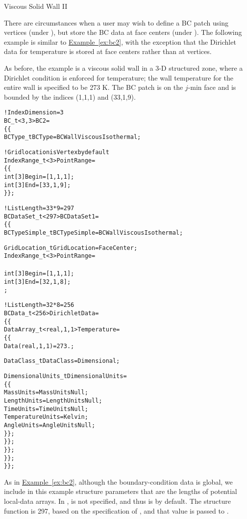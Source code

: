 \newpage
\begin{example}{Viscous Solid Wall II}
\label{ex:bc6}

There are circumstances when a user may wish to define a BC patch using
vertices (under ), but store the BC data at face centers
(under ).
The following example is similar to \hyperref[ex:bc2]{Example~\ref*{ex:bc2}},
with the exception that the Dirichlet data for temperature is stored at
face centers rather than at vertices.

As before, the example is a viscous solid wall in a 3-D structured
zone, where a Dirichlet condition is enforced for temperature; the wall
temperature for the entire wall is specified to be 273 K.
The BC patch is on the $j$-min face and is bounded by the indices
(1,1,1) and (33,1,9).
\begin{alltt}
  !  IndexDimension = 3
  BC\_t<3,3> BC2 =
    \{\{
    BCType\_t BCType = BCWallViscousIsothermal ;

    !  Grid location is Vertex by default
    IndexRange\_t<3> PointRange =
      \{\{
      int[3] Begin = [1 ,1,1] ;
      int[3] End   = [33,1,9] ;
      \}\} ;

    !  ListLength = 33*9 = 297
    BCDataSet\_t<297> BCDataSet1 =
      \{\{
      BCTypeSimple\_t BCTypeSimple = BCWallViscousIsothermal ;

      GridLocation\_t GridLocation = FaceCenter ;
      IndexRange\_t<3> PointRange =
        {{
        int[3] Begin = [1 ,1,1] ;
        int[3] End   = [32,1,8] ;
        }} ;

      !  ListLength = 32*8 = 256
      BCData\_t<256> DirichletData =
        \{\{
        DataArray\_t<real, 1, 1> Temperature =
          \{\{
          Data(real, 1, 1) = 273. ;
          
          DataClass\_t DataClass = Dimensional ;

          DimensionalUnits\_t DimensionalUnits = 
            \{\{
            MassUnits        = MassUnitsNull ;
            LengthUnits      = LengthUnitsNull ;
            TimeUnits        = TimeUnitsNull ;
            TemperatureUnits = Kelvin ;
            AngleUnits       = AngleUnitsNull ;
            \}\} ;
          \}\} ;
        \}\} ;
      \}\} ;
    \}\} ;
\end{alltt}

As in \hyperref[ex:bc2]{Example~\ref*{ex:bc2}},
although the boundary-condition data is global, we include in this
example structure parameters that are the lengths of potential
local-data arrays.
In ,  is not specified, and thus is
 by default.
The structure function  is 297, based on the
specification of , and that value is passed to
.


\end{example}

